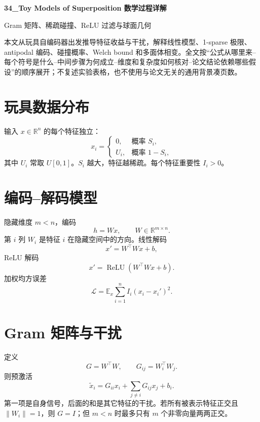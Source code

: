 \documentclass[UTF8,12pt,a4paper,fontset=none]{ctexart}
\numberwithin{equation}{section}
\newcommand{\R}{\mathbb{R}}
\newcommand{\E}{\mathbb{E}}
\newcommand{\Loss}{\mathcal{L}}
\newcommand{\norm}[1]{\left\lVert #1\right\rVert}
\begin{document}
\begin{center}
{\LARGE\bfseries 34\_Toy Models of Superposition 数学过程详解}\par
\vspace{0.35em}
{\large Gram 矩阵、稀疏碰撞、ReLU 过滤与球面几何}
\end{center}
\vspace{0.45em}
\begin{keybox}[本文只处理真正需要推导的部分]
本文从玩具自编码器出发推导特征收益与干扰，解释线性模型、1-sparse 极限、antipodal 编码、碰撞概率、Welch bound 和多面体相变。全文按“公式从哪里来--每个符号是什么--中间步骤为何成立--维度和复杂度如何核对--论文结论依赖哪些假设”的顺序展开；不复述实验表格，也不使用与论文无关的通用背景凑页数。
\end{keybox}
\tableofcontents
\newpage

\section{玩具数据分布}
输入 $x\in\R^n$ 的每个特征独立：
\begin{equation}
 x_i=\begin{cases}
 0,&\text{概率 }S_i,\\
 U_i,&\text{概率 }1-S_i,
 \end{cases}
\end{equation}
其中 $U_i$ 常取 $U[0,1]$。$S_i$ 越大，特征越稀疏。每个特征重要性 $I_i>0$。

\section{编码--解码模型}
隐藏维度 $m<n$，编码
\begin{equation}
 h=Wx,
 \qquad W\in\R^{m\times n}.
\end{equation}
第 $i$ 列 $W_i$ 是特征 $i$ 在隐藏空间中的方向。线性解码
\begin{equation}
 x'=W^\top Wx+b,
\end{equation}
ReLU 解码
\begin{equation}
 \boxed{x'=\operatorname{ReLU}(W^\top Wx+b)}.
\end{equation}
加权均方误差
\begin{equation}
 \boxed{\Loss=\E_x\sum_{i=1}^{n}I_i(x_i-x_i')^2}.
\end{equation}

\section{Gram 矩阵与干扰}
定义
\begin{equation}
 G=W^\top W,
 \qquad G_{ij}=W_i^\top W_j.
\end{equation}
则预激活
\begin{equation}
 \widetilde x_i=G_{ii}x_i+
 \sum_{j\ne i}G_{ij}x_j+b_i.
\end{equation}
第一项是自身信号，后面的和是其它特征的干扰。若所有被表示特征正交且 $\norm{W_i}=1$，则 $G=I$；但 $m<n$ 时最多只有 $m$ 个非零向量两两正交。
\end{document}
